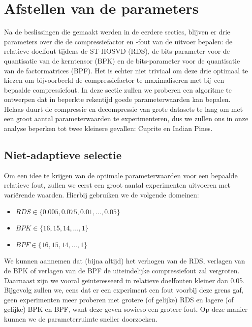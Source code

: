 \section{Afstellen van de parameters}

Na de beslissingen die gemaakt werden in de eerdere secties, blijven er drie parameters over die de compressiefactor en -fout van de uitvoer bepalen: de relatieve doelfout tijdens de ST-HOSVD (RDS), de bits-parameter voor de quantisatie van de kerntensor (BPK) en de bits-parameter voor de quantisatie van de factormatrices (BPF). Het is echter niet triviaal om deze drie optimaal te kiezen om bijvoorbeeld de compressiefactor te maximaliseren met bij een bepaalde compressiefout. In deze sectie zullen we proberen een algoritme te ontwerpen dat in beperkte rekentijd goede parameterwaarden kan bepalen.\\

Helaas duurt de compressie en decompressie van grote datasets te lang om met een groot aantal parameterwaarden te experimenteren, dus we zullen ons in onze analyse beperken tot twee kleinere gevallen: Cuprite en Indian Pines.

\subsection{Niet-adaptieve selectie}

Om een idee te krijgen van de optimale parameterwaarden voor een bepaalde relatieve fout, zullen we eerst een groot aantal experimenten uitvoeren met vari\"erende waarden. Hierbij gebruiken we de volgende domeinen:

\begin{itemize}
\item $RDS \in \{0.005, 0.075, 0.01, \dots, 0.05\}$
\item $BPK \in \{16, 15, 14, \dots, 1\}$
\item $BPF \in \{16, 15, 14, \dots, 1\}$
\end{itemize}

We kunnen aannemen dat (bijna altijd) het verhogen van de RDS, verlagen van de BPK of verlagen van de BPF de uiteindelijke compressiefout zal vergroten. Daarnaast zijn we vooral ge\"interesseerd in relatieve doelfouten kleiner dan 0.05. Bijgevolg zullen we, eens dat er een experiment een fout voorbij deze grens gaf, geen experimenten meer proberen met grotere (of gelijke) RDS en lagere (of gelijke) BPK en BPF, want deze geven sowieso een grotere fout. Op deze manier kunnen we de parameterruimte sneller doorzoeken.


